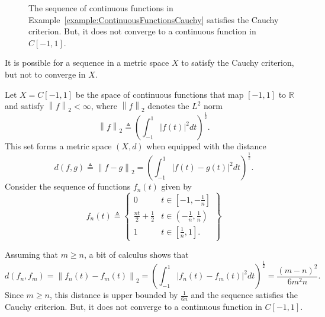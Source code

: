 \begin{figure}[ht]
\begin{center}
\vspace{-8mm}
\end{center}
\caption{The sequence of continuous functions in Example~\ref{example:ContinuousFunctionsCauchy} satisfies the Cauchy criterion.
But, it does not converge to a continuous function in $C[-1,1]$.}
\end{figure}

It is possible for a sequence in a metric space $X$ to satisfy the Cauchy criterion, but not to converge in $X$.

\begin{example}
\label{example:ContinuousFunctionsCauchy}
Let $X=C[-1,1]$ be the space of continuous functions that map $[-1,1]$ to $\mathbb{R}$ and satisfy $\left\| f \right\|_2 < \infty$, where $\left\| f \right\|_2$ denotes the $L^2$ norm
\begin{equation*}
\left\| f \right\|_2 \triangleq \left( \int_{-1}^1 |f(t)|^2 dt \right)^{\frac{1}{2}}.
\end{equation*}
This set forms a metric space $(X,d)$ when equipped with the distance
\[ d(f, g) \triangleq \left\| f - g \right\|_2
= \left( \int_{-1}^1 |f(t) - g(t)|^2 dt \right)^{\frac{1}{2}}. \]
Consider the sequence of functions $f_n(t)$ given by
\begin{equation*}
f_n(t) \triangleq \left\{ \begin{array}{ll}
0 & t \in \left[ -1, -\frac{1}{n} \right] \\
\frac{nt}{2} + \frac{1}{2} & t \in \left( -\frac{1}{n}, \frac{1}{n} \right) \\
1 & t \in \left[ \frac{1}{n}, 1 \right].
\end{array} \right\}
\end{equation*}

Assuming that $m \geq n$, a bit of calculus shows that
\begin{equation*}
d(f_n, f_m) = \left\| f_n(t) - f_m(t) \right\|_2
= \left( \int_{-1}^1 |f_n(t) - f_m(t)|^2 dt \right)^{\frac{1}{2}}
= \frac{(m-n)^2}{6m^2n}.
\end{equation*}
Since $m\geq n$, this distance is upper bounded by $\frac{1}{6n}$ and the sequence satisfies the Cauchy criterion.
But, it does not converge to a continuous function in $C[-1,1]$.
\end{example}


